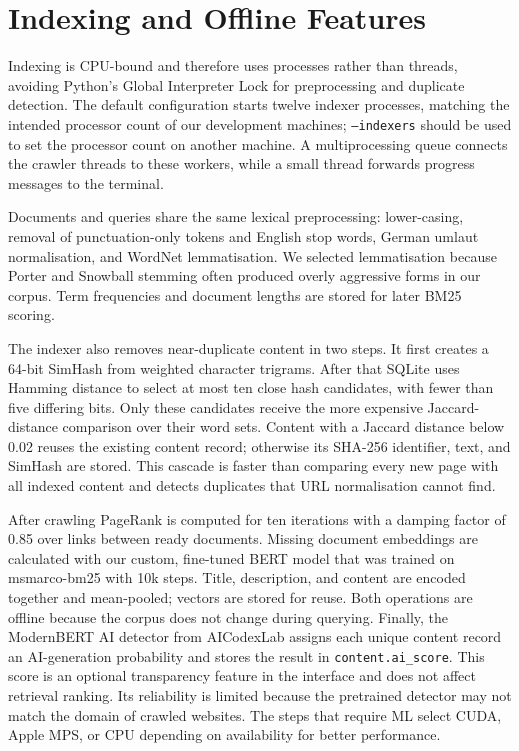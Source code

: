 \documentclass[12pt,a4paper]{article}
\begin{document}
\section{Indexing and Offline Features}

Indexing is CPU-bound and therefore uses processes rather than threads, avoiding Python's Global Interpreter Lock for preprocessing and duplicate detection. The default configuration starts twelve indexer processes, matching the intended processor count of our development machines; \texttt{--indexers} should be used to set the processor count on another machine. A multiprocessing queue connects the crawler threads to these workers, while a small thread forwards progress messages to the terminal.

Documents and queries share the same lexical preprocessing: lower-casing, removal of punctuation-only tokens and English stop words, German umlaut normalisation, and WordNet lemmatisation. We selected lemmatisation because Porter and Snowball stemming often produced overly aggressive forms in our corpus. Term frequencies and document lengths are stored for later BM25 scoring.

The indexer also removes near-duplicate content in two steps. It first creates a 64-bit SimHash from weighted character trigrams. After that SQLite uses Hamming distance to select at most ten close hash candidates, with fewer than five differing bits. Only these candidates receive the more expensive Jaccard-distance comparison over their word sets. Content with a Jaccard distance below 0.02 reuses the existing content record; otherwise its SHA-256 identifier, text, and SimHash are stored. This cascade is faster than comparing every new page with all indexed content and detects duplicates that URL normalisation cannot find.

After crawling PageRank is computed for ten iterations with a damping factor of 0.85 over links between ready documents. Missing document embeddings are calculated with our custom, fine-tuned BERT model that was trained on msmarco-bm25 with 10k steps. Title, description, and content are encoded together and mean-pooled; vectors are stored for reuse. Both operations are offline because the corpus does not change during querying. Finally, the ModernBERT AI detector from AICodexLab assigns each unique content record an AI-generation probability and stores the result in \texttt{content.ai\_score}. This score is an optional transparency feature in the interface and does not affect retrieval ranking. Its reliability is limited because the pretrained detector may not match the domain of crawled websites. The steps that require ML select CUDA, Apple MPS, or CPU depending on availability for better performance.
\end{document}
